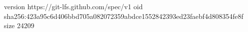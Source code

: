 version https://git-lfs.github.com/spec/v1
oid sha256:423a95c6d406bbd705a082072359abdce1552842393ed23faebf4d808354fe8f
size 24209
